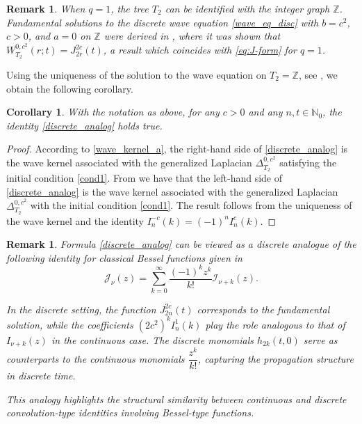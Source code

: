 \documentclass[12pt]{amsart}
\numberwithin{equation}{section}
\newtheorem{corollary}[theorem]{Corollary}
\theoremstyle{boldremark}
\newtheorem{remark}[theorem]{Remark}
\begin{document}
\begin{remark}
When $q=1$, the tree $T_2$ can be identified with the integer graph $\mathbb{Z}$. Fundamental solutions to the discrete wave equation \eqref{wave_eq_disc} with $b=c^2$, $c>0$, and $a=0$ on $\mathbb{Z}$ were derived in \cite[Theorem 3.1]{Slav18}, where it was shown that $W_{T_2}^{0,c^2}(r;t) = J_{2r}^{2c}(t)$, a result which coincides with \eqref{eq:J-form} for $q=1$.
\end{remark}

Using the uniqueness of the solution to the wave equation on $T_2=\mathbb{Z}$, see \cite[Theorem 2.3]{Slav17}, we obtain the following corollary.

\begin{corollary} \label{cor: I and J rel}
 With the notation as above, for any $c>0$ and any $n,t\in\mathbb N_0$, the identity \eqref{discrete_analog} holds true.
\end{corollary}
\begin{proof}
According to  \eqref{wave_kernel_a}, the right-hand side of \eqref{discrete_analog} is the wave kernel associated with the generalized Laplacian $\Delta_{T_2}^{0,c^2}$ satisfying the initial condition \eqref{cond1}. From \cite[Theorem 3.1]{Slav18} we have that the left-hand side of \eqref{discrete_analog} is the wave kernel associated with the generalized Laplacian $\Delta_{T_2}^{0,c^2}$ with the initial condition \eqref{cond1}. The result follows from the uniqueness of the wave kernel and the identity $I_n^{-c}(k)=(-1)^n I_n^c(k)$.
\end{proof}

\begin{remark}
Formula \eqref{discrete_analog} can be viewed as a discrete analogue of the following identity for classical Bessel functions given in \cite[Eq.~9.6.52]{AS}
\begin{equation*}
       \mathcal{J}_{\nu}(z) = \sum_{k=0}^{\infty} \frac{(-1)^k z^k}{k!} \mathcal{I}_{\nu+k}(z).
\end{equation*}

In the discrete setting, the function $J_{2n}^{2c}(t)$ corresponds to the fundamental solution, while the coefficients $(2c^2)^kI_n^{1}(k)$ play the role analogous to that of $I_{\nu+k}(z)$ in the continuous case. The discrete monomials $ h_{2k}(t,0)$ serve as counterparts to the continuous monomials $\dfrac{z^k}{k!}$, capturing the propagation structure in discrete time. 

This analogy highlights the structural similarity between continuous and discrete convolution-type identities involving Bessel-type functions.
\end{remark}
\end{document}
